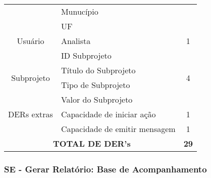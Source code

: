 \begin{table}[!h]
\begin{tabular}{|c|l|c|}
				& Munucípio                     &                      \\ \cline{2-2}
				& UF                            &                      \\ \hline
    Usuário                     & Analista                      & 1                    \\ \hline
    \multirow{4}{*}{Subprojeto} & ID Subprojeto                 & \multirow{4}{*}{4}   \\ \cline{2-2}
				& Título do Subprojeto          &                      \\ \cline{2-2}
				& Tipo de Subprojeto            &                      \\ \cline{2-2}
				& Valor do Subprojeto           &                      \\ \hline
    DERs extras                 & Capacidade de iniciar ação    & 1                    \\ \hline
    \multicolumn{1}{|l|}{}      & Capacidade de emitir mensagem & 1                    \\ \hline
    \multicolumn{2}{|c|}{\textbf{TOTAL DE DER's}}          & \textbf{29}         \\ \hline
    \end{tabular}
    \end{table}
  
\vfill
\pagebreak
  \subsubsection{SE - Gerar Relatório: Base de Acompanhamento}
   

